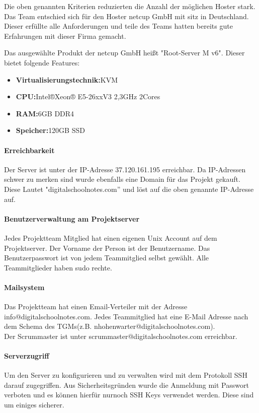 \newpage

Die oben genannten Kriterien reduzierten die Anzahl der möglichen Hoster stark. Das Team entschied sich für den Hoster netcup GmbH mit sitz in Deutschland. Dieser erfüllte alle Anforderungen und teile des Teams hatten bereits gute Erfahrungen mit dieser Firma gemacht.

Das ausgewählte Produkt der netcup GmbH heißt "Root-Server M v6". Dieser bietet folgende Features:
\begin{itemize}
\item \textbf{Virtualisierungstechnik:}\gls{KVM}
\item \textbf{CPU:}Intel®Xeon® E5-26xxV3 2,3GHz 2Cores
\item \textbf{RAM:}6GB DDR4
\item \textbf{Speicher:}120GB SSD
\end{itemize}

\paragraph{Erreichbarkeit}
Der Server ist unter der IP-Adresse 37.120.161.195 erreichbar. Da IP-Adressen schwer zu merken sind wurde ebenfalls eine Domain für das Projekt gekauft. Diese Lautet "digitalschoolnotes.com'' und löst auf die oben genannte IP-Adresse auf.

\paragraph{Benutzerverwaltung am Projektserver}
Jedes Projektteam Mitglied hat einen eigenen Unix Account auf dem Projektserver. Der Vorname der Person ist der Benutzername. Das Benutzerpasswort ist von jedem Teammitglied selbst gewählt. Alle Teammitglieder haben sudo rechte. 

\paragraph{Mailsystem}
Das Projektteam hat einen Email-Verteiler mit der Adresse info@digitalschoolnotes.com. Jedes Teammitglied hat eine E-Mail Adresse nach dem Schema des \gls{TGM}s(z.B. nhohenwarter@digitalschoolnotes.com). \\
Der Scrummaster ist unter scrummaster@digitalschoolnotes.com erreichbar.

\paragraph{Serverzugriff}
Um den Server zu konfigurieren und zu verwalten wird mit dem Protokoll \gls{SSH} darauf zugegriffen. Aus Sicherheitsgründen wurde die Anmeldung mit Passwort verboten und es können hierfür nurnoch SSH Keys verwendet werden. Diese sind um einiges sicherer.
\newpage

